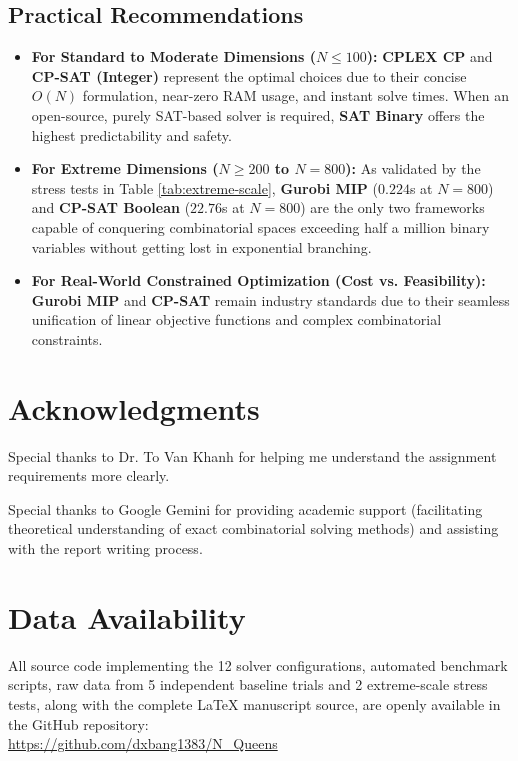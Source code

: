 \documentclass[a4paper,11pt]{article}
\begin{document}
\subsection{Practical Recommendations}
\begin{itemize}
    \item \textbf{For Standard to Moderate Dimensions ($N \le 100$):} \textbf{CPLEX CP} and \textbf{CP-SAT (Integer)} represent the optimal choices due to their concise $O(N)$ formulation, near-zero RAM usage, and instant solve times. When an open-source, purely SAT-based solver is required, \textbf{SAT Binary} offers the highest predictability and safety.
    \item \textbf{For Extreme Dimensions ($N \ge 200$ to $N=800$):} As validated by the stress tests in Table \ref{tab:extreme-scale}, \textbf{Gurobi MIP} ($0.224$s at $N=800$) and \textbf{CP-SAT Boolean} ($22.76$s at $N=800$) are the only two frameworks capable of conquering combinatorial spaces exceeding half a million binary variables without getting lost in exponential branching.
    \item \textbf{For Real-World Constrained Optimization (Cost vs. Feasibility):} \textbf{Gurobi MIP} and \textbf{CP-SAT} remain industry standards due to their seamless unification of linear objective functions and complex combinatorial constraints.
\end{itemize}

\section*{Acknowledgments}
\noindent Special thanks to Dr. To Van Khanh for helping me understand the assignment requirements more clearly.

\noindent Special thanks to Google Gemini for providing academic support (facilitating theoretical understanding of exact combinatorial solving methods) and assisting with the report writing process.

\section*{Data Availability}
\noindent All source code implementing the 12 solver configurations, automated benchmark scripts, raw data from 5 independent baseline trials and 2 extreme-scale stress tests, along with the complete \LaTeX{} manuscript source, are openly available in the GitHub repository: \\
\url{https://github.com/dxbang1383/N_Queens}
\end{document}
